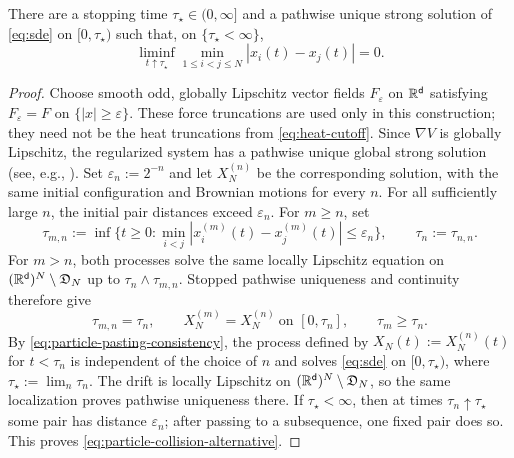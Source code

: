 \documentclass[11pt,reqno]{amsart}
\numberwithin{equation}{section}
\theoremstyle{plain}
\theoremstyle{remark}
\renewcommand{\d}{\mathsf{d}}\newcommand{\s}{\mathsf{s}}
\begin{document}
\begin{lemma}\label{lem:particle-maximal}
There are a stopping time $\tau_\star\in(0,\infty]$ and a pathwise unique strong solution of \eqref{eq:sde} on $[0,\tau_\star)$ such that, on $\{\tau_\star<\infty\}$,
\begin{equation}\label{eq:particle-collision-alternative}
 \liminf_{t\uparrow\tau_\star}\min_{1\le i<j\le N}|x_i(t)-x_j(t)|=0.
\end{equation}
\end{lemma}
\begin{proof}
Choose smooth odd, globally Lipschitz vector fields $F_\varepsilon$ on $\R^\d$ satisfying $F_\varepsilon=F$ on $\{|x|\ge\varepsilon\}$. These force truncations are used only in this construction; they need not be the heat truncations from \cref{eq:heat-cutoff}. Since $\nabla V$ is globally Lipschitz, the regularized system has a pathwise unique global strong solution (see, e.g., \cite[\S5.2]{Oksendal}). Set $\varepsilon_n:=2^{-n}$ and let $X_N^{(n)}$ be the corresponding solution, with the same initial configuration and Brownian motions for every $n$. For all sufficiently large $n$, the initial pair distances exceed $\varepsilon_n$. For $m\ge n$, set
\begin{equation}\label{eq:particle-coarse-entrance}
 \tau_{m,n}:=\inf\{t\ge0:\min_{i<j}|x_i^{(m)}(t)-x_j^{(m)}(t)|\le\varepsilon_n\},
 \qquad \tau_n:=\tau_{n,n}.
\end{equation}
For $m>n$, both processes solve the same locally Lipschitz equation on $(\R^\d)^N\setminus\mathfrak D_N$ up to $\tau_n\wedge\tau_{m,n}$. Stopped pathwise uniqueness and continuity therefore give
\begin{equation}\label{eq:particle-pasting-consistency}
 \tau_{m,n}=\tau_n,
 \qquad
 X_N^{(m)}=X_N^{(n)}\ \text{on }[0,\tau_n],
 \qquad
 \tau_m\ge\tau_n.
\end{equation}
By \eqref{eq:particle-pasting-consistency}, the process defined by $X_N(t):=X_N^{(n)}(t)$ for $t<\tau_n$ is independent of the choice of $n$ and solves \eqref{eq:sde} on $[0,\tau_\star)$, where $\tau_\star:=\lim_n\tau_n$. The drift is locally Lipschitz on $(\R^\d)^N\setminus\mathfrak D_N$, so the same localization proves pathwise uniqueness there. If $\tau_\star<\infty$, then at times $\tau_n\uparrow\tau_\star$ some pair has distance $\varepsilon_n$; after passing to a subsequence, one fixed pair does so. This proves \eqref{eq:particle-collision-alternative}.
\end{proof}
\end{document}
